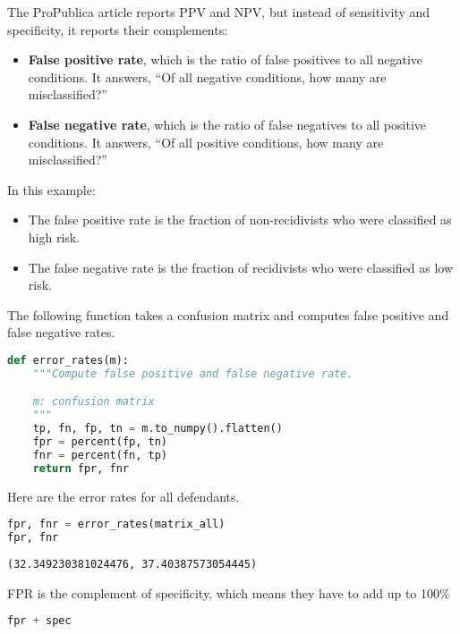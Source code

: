 The ProPublica article reports PPV and NPV, but instead of sensitivity
and specificity, it reports their complements:

\begin{itemize}
\item
  \textbf{False positive rate}, which is the ratio of false positives to
  all negative conditions. It answers, ``Of all negative conditions, how
  many are misclassified?''
\item
  \textbf{False negative rate}, which is the ratio of false negatives to
  all positive conditions. It answers, ``Of all positive conditions, how
  many are misclassified?''
\end{itemize}

In this example:

\begin{itemize}
\item
  The false positive rate is the fraction of non-recidivists who were
  classified as high risk.
\item
  The false negative rate is the fraction of recidivists who were
  classified as low risk.
\end{itemize}

The following function takes a confusion matrix and computes false
positive and false negative rates.

\begin{lstlisting}[language=Python,style=source]
def error_rates(m):
    """Compute false positive and false negative rate.

    m: confusion matrix
    """
    tp, fn, fp, tn = m.to_numpy().flatten()
    fpr = percent(fp, tn)
    fnr = percent(fn, tp)
    return fpr, fnr
\end{lstlisting}

Here are the error rates for all defendants.

\begin{lstlisting}[language=Python,style=source]
fpr, fnr = error_rates(matrix_all)
fpr, fnr
\end{lstlisting}

\begin{lstlisting}[style=output]
(32.349230381024476, 37.40387573054445)
\end{lstlisting}

FPR is the complement of specificity, which means they have to add up to
100\%

\begin{lstlisting}[language=Python,style=source]
fpr + spec
\end{lstlisting}

